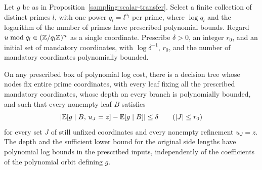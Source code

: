\begin{proposition}
\label{sampling:stability}
Let $g$ be as in Proposition~\ref{sampling:scalar-transfer}.  Select a finite
collection of distinct primes $l$, with one power $q_l=l^{a_l}$ per prime,
where $\log q_l$ and the logarithm of the number of primes have prescribed
polynomial bounds.  Regard $u\bmod q_l\in(\mathbb Z/q_l\mathbb Z)^n$ as a single
coordinate.  Prescribe $\delta>0$, an integer $r_0$, and an initial set of
mandatory coordinates, with $\log\delta^{-1}$, $r_0$, and the number of
mandatory coordinates polynomially bounded.

On any prescribed box of polynomial log cost, there is a decision tree
whose nodes fix entire prime coordinates,
with every leaf fixing all the prescribed mandatory coordinates,
whose depth on every branch is polynomially bounded, and such that every
nonempty leaf $B$ satisfies
\begin{equation}\label{sampling:stable-leaf}
 \left|\mathbb E[g\mid B,\,u_J=z]-\mathbb E[g\mid B]\right|\le\delta
 \qquad(|J|\le r_0)
\end{equation}
for every set $J$ of still unfixed coordinates and every nonempty refinement
$u_J=z$.  The depth and the sufficient lower bound for the original side
lengths have polynomial log bounds in the prescribed inputs, independently
of the coefficients of the polynomial orbit defining $g$.
\end{proposition}

